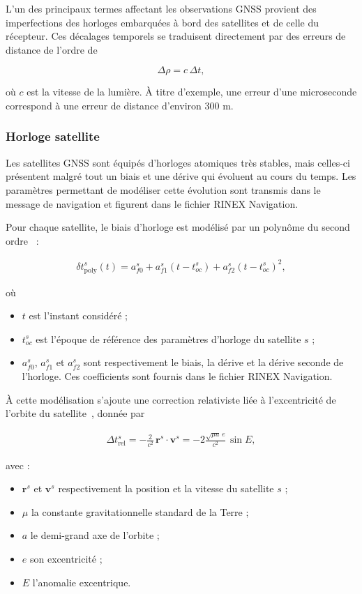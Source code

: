 L'un des principaux termes affectant les observations GNSS provient des imperfections des horloges embarquées à bord des satellites et de celle du récepteur. Ces décalages temporels se traduisent directement par des erreurs de distance de l'ordre de

\[
\Delta \rho = c\,\Delta t,
\]

où $c$ est la vitesse de la lumière. À titre d'exemple, une erreur d'une microseconde correspond à une erreur de distance d'environ $300$ m.

\subsubsection{Horloge satellite}

Les satellites GNSS sont équipés d'horloges atomiques très stables, mais celles-ci présentent malgré tout un biais et une dérive qui évoluent au cours du temps. Les paramètres permettant de modéliser cette évolution sont transmis dans le message de navigation et figurent dans le fichier RINEX Navigation.

Pour chaque satellite, le biais d'horloge est modélisé par un polynôme du second ordre~\cite{isgps200n} :

\begin{align}
\delta t_{\mathrm{poly}}^s(t)
=
a_{f0}^s
+
a_{f1}^s(t-t_{oc}^s)
+
a_{f2}^s(t-t_{oc}^s)^2,
\end{align}

où

\begin{itemize}
    \item $t$ est l'instant considéré ;
    \item $t_{oc}^s$ est l'époque de référence des paramètres d'horloge du
    satellite $s$ ;
    \item $a_{f0}^s$, $a_{f1}^s$ et $a_{f2}^s$ sont respectivement le biais,
    la dérive et la dérive seconde de l'horloge. Ces coefficients sont fournis
    dans le fichier RINEX Navigation.
\end{itemize}

À cette modélisation s'ajoute une correction relativiste liée à l'excentricité de l'orbite du satellite~\cite{ashby2003}, donnée par

\begin{align}
\Delta t_{\mathrm{rel}}^s
=
-\frac{2}{c^2}\,
\mathbf r^s \cdot \mathbf v^s
=
-2\frac{\sqrt{\mu a}\,e}{c^2}\,\sin E,
\end{align}

avec :
\begin{itemize}
    \item $\mathbf r^s$ et $\mathbf v^s$ respectivement la position et la
    vitesse du satellite $s$ ;
    \item $\mu$  la constante gravitationnelle standard de la Terre ;
    \item $a$ le demi-grand axe de l'orbite ;
    \item $e$ son excentricité ;
    \item $E$ l'anomalie excentrique.
\end{itemize}

